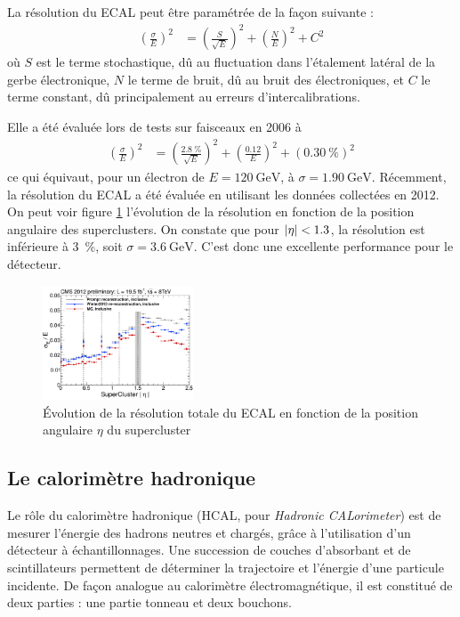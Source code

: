 \bigskip

La résolution du ECAL peut être paramétrée de la façon suivante :
\begin{align*}
  \left( \frac{\sigma}{E} \right)^2 &= \left( \frac{S}{\sqrt{E}} \right)^2 + \left( \frac{N}{E} \right)^2 + C^2
\end{align*}
où $S$ est le terme stochastique, dû au fluctuation dans l'étalement latéral de la gerbe électronique, $N$ le terme de bruit, dû au bruit des électroniques, et $C$ le terme constant, dû principalement au erreurs d'intercalibrations.

Elle a été évaluée lors de tests sur faisceaux en 2006 à
\begin{align*}
  \left( \frac{\sigma}{E} \right)^2 &= \left( \frac{\SI{2.8}{\%}}{\sqrt{E}} \right)^2 + \left( \frac{\num{0.12}}{E} \right)^2 + \left(\SI{0.30}{\%}\right)^2
\end{align*}
ce qui équivaut, pour un électron de $E = \SI{120}{\GeV}$, à $\sigma = \SI{1.90}{\GeV}$. Récemment, la résolution du ECAL a été évaluée en utilisant les données collectées en 2012. On peut voir figure \ref{fig:ecal_resolution} l'évolution de la résolution en fonction de la position angulaire des superclusters. On constate que pour $\lvert \eta \rvert < 1.3$, la résolution est inférieure à \SI{3}{\%}, soit $\sigma = \SI{3.6}{\GeV}$. C'est donc une excellente performance pour le détecteur.

\begin{figure} \centering
  \includegraphics[width=0.4\textwidth]{chapitre2/figs/ecal_resolution.pdf}
  \caption{Évolution de la résolution totale du ECAL en fonction de la position angulaire $\eta$ du supercluster}
  \label{fig:ecal_resolution}
\end{figure}

\subsection{Le calorimètre hadronique}

Le rôle du calorimètre hadronique (HCAL, pour \emph{Hadronic CALorimeter}) est de mesurer l'énergie des hadrons neutres et chargés, grâce à l'utilisation d'un détecteur à échantillonnages. Une succession de couches d'absorbant et de scintillateurs permettent de déterminer la trajectoire et l'énergie d'une particule incidente. De façon analogue au calorimètre électromagnétique, il est constitué de deux parties : une partie tonneau et deux bouchons.

